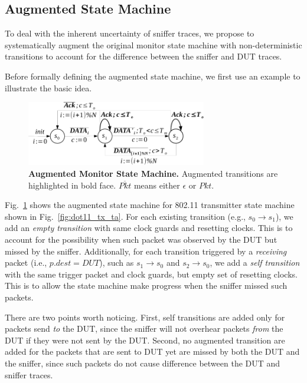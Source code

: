 \subsection{Augmented State Machine}
\label{subsec:augment}

To deal with the inherent uncertainty of sniffer traces, we propose to
systematically augment the original monitor state machine with non-deterministic
transitions to account for the difference between the sniffer and DUT traces.

Before formally defining the augmented state machine, we first use an example to
illustrate the basic idea.

\begin{figure}[h!]
  \vspace*{\beforecaptionskip}
  \centering
  \includegraphics[width=0.7\textwidth]{./figures/dot11_tx_checker.pdf}
  \caption{\textbf{Augmented Monitor State Machine.} Augmented transitions are
  highlighted in bold face. $\overline{Pkt}$ means either $\epsilon$ or $Pkt$.}
  \label{fig:augment}
  \vspace*{\aftercaptionskip}
\end{figure}


Fig.~\ref{fig:augment} shows the augmented state machine for 802.11 transmitter
state machine shown in Fig.~\ref{fig:dot11_tx_ta}.  For each existing transition
(e.g., $s_0\rightarrow s_1$), we add an \textit{empty transition} with same
clock guards and resetting clocks.  This is to account for the possibility when
such packet was observed by the DUT but missed by the sniffer.  Additionally,
for each transition triggered by a \textit{receiving} packet (i.e., $p.dest =
DUT$), such as $s_1\rightarrow s_0$ and $s_2\rightarrow s_0$, we add a
\textit{self transition} with the same trigger packet and clock guards, but
empty set of resetting clocks. This is to allow the state machine make progress
when the sniffer missed such packets.

There are two points worth noticing. First, self transitions are added only for
packets send \textit{to} the DUT, since the sniffer will not overhear packets
\textit{from} the DUT if they were not sent by the DUT. Second, no augmented
transition are added for the packets that are sent to DUT yet are missed by both
the DUT and the sniffer, since such packets do not cause difference between the
DUT and sniffer traces.


